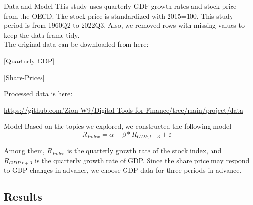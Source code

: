 \documentclass[10pt]{beamer}
\begin{document}
\begin{frame}{Data and Model}
This study uses quarterly GDP growth rates and stock price from the OECD. The stock
price is standardized with 2015=100. This study period is from 1960Q2 to 2022Q3. Also, we removed rows with missing values to keep the data frame tidy.
\\
The original data can be downloaded from here:
    \begin{center}
        \href{https://data.oecd.org/gdp/quarterly-gdp.htm}{[Quarterly-GDP]} 
    \end{center}
    \begin{center}
        \href{https://data.oecd.org/price/share-prices.htm}{[Share-Prices]} 
    \end{center}

Processed data is here:

\begin{center}\url{https://github.com/Zion-W9/Digital-Tools-for-Finance/tree/main/project/data}\end{center}

\end{frame}

\begin{frame}{Model}
Based on the topics we explored, we constructed the following model:
  \begin{equation*}
    R_{Index} = \alpha + \beta * R_{GDP,t-3} + \varepsilon
  \end{equation*}

  Among them, $R_{Index}$ is the quarterly growth rate of the stock index, and $R_{GDP,t+3}$ is the quarterly growth rate of GDP. Since the share price may respond to GDP changes in advance, we choose GDP data for three periods in advance.
\end{frame}


\subsection{Results}
\end{document}
